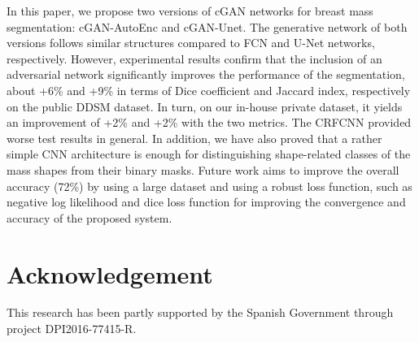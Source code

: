 \documentclass[runningheads,a4paper]{llncs}
\begin{document}
In this paper, we propose two versions of cGAN networks for breast mass segmentation: cGAN-AutoEnc and cGAN-Unet. The generative network of both versions follows similar structures compared to FCN and U-Net networks, respectively. However, experimental results confirm that the inclusion of an adversarial network significantly improves the performance of the segmentation, about +6\% and +9\% in terms of Dice coefficient and Jaccard index, respectively on the public DDSM dataset. In turn, on our in-house private dataset, it yields an improvement of +2\% and +2\% with the two metrics. The CRFCNN provided worse test results in general. In addition, we have also proved that a rather simple CNN architecture is enough for distinguishing shape-related classes of the mass shapes from their binary masks. Future work aims to improve the overall accuracy (72\%) by using a large dataset and using a robust loss function, such as negative log likelihood and dice loss function for improving the convergence and accuracy of the proposed system.

\section*{Acknowledgement}
This research has been partly supported by the Spanish Government through project DPI2016-77415-R.


 
\end{document}
